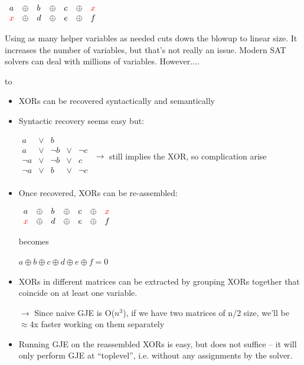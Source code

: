 \documentclass[aspectratio=196]{slides}
\def\TITLE#1{\hbox to \linewidth{\large #1\hfill}}
\def\BOTTOM{\vfill\newpage}
\def\SLIDE#1{\BOTTOM\TITLE{#1}}
\begin{document}
$\begin{array}{lllllll}
a& \oplus &b& \oplus &c & \oplus &{\color{red}x}\\
{\color{red}x}& \oplus &d& \oplus &e & \oplus &f\\
\end{array}$

Using as many helper variables as needed cuts down the blowup to linear size. It increases the number of variables, but that's not really an issue. Modern SAT solvers can deal with millions of variables. However....

\vfill
\newpage

\SLIDE{XOR manipulation once in CNF format}

\begin{itemize}
\item XORs can be recovered syntactically and semantically
\item Syntactic recovery seems easy but:

$\begin{array}{rrrrr}
a& \vee &b& \\
a& \vee &\neg b& \vee &\neg c\\
\neg a& \vee &\neg b& \vee &c\\
\neg a& \vee &b& \vee &\neg c\\
\end{array}$
$\rightarrow$ still implies the XOR, so complication arise
\item Once recovered, XORs can be re-assembled:

$\begin{array}{lllllll}
a& \oplus &b& \oplus &c & \oplus &{\color{red}x}\\
{\color{red}x}& \oplus &d& \oplus &e & \oplus &f\\
\end{array}$

becomes

$a\oplus b\oplus c\oplus d\oplus e\oplus f=0$

\item XORs in different matrices can be extracted by grouping XORs together that coincide on at least one variable.

$\rightarrow$ Since naive GJE is O($n^3$), if we have two matrices of n/2 size, we'll be $\approx 4$x faster working on them separately

\item Running GJE on the reassembled XORs is easy, but does not suffice -- it will only perform GJE at ``toplevel'', i.e. without any assignments by the solver.
\end{itemize}
\end{document}
